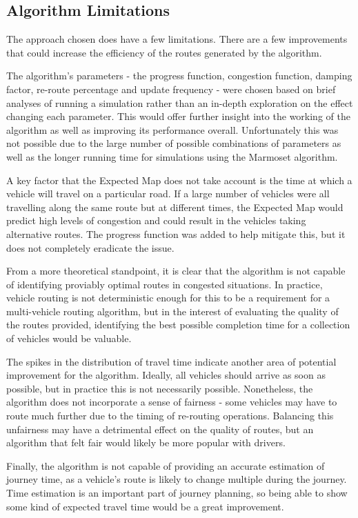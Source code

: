 \documentclass[ %
                    author={Alexander Hill},
                supervisor={Dr. Benjamin Sach},
                    degree={MEng},
                     title={MARMOSET},
                  subtitle={Multi-Agent Route Management using Online Simulation for Efficient Transportation},
                      type={research},
                      year={2016} ]{dissertation}
\begin{document}
\subsection{Algorithm Limitations}\label{sec:algolim}

The approach chosen does have a few limitations. There are a few improvements
that could increase the efficiency of the routes generated by the algorithm.

The algorithm's parameters - the progress function, congestion function, damping
factor, re-route percentage and update frequency - were chosen based on brief
analyses of running a simulation rather than an in-depth exploration on the
effect changing each parameter. This would offer further insight into the
working of the algorithm as well as improving its performance overall.
Unfortunately this was not possible due to the large number of possible
combinations of parameters as well as the longer running time for simulations
using the Marmoset algorithm.

A key factor that the Expected Map does not take account is the time at which a
vehicle will travel on a particular road. If a large number of vehicles were all
travelling along the same route but at different times, the Expected Map would
predict high levels of congestion and could result in the vehicles taking
alternative routes. The progress function was added to help mitigate this, but
it does not completely eradicate the issue.

From a more theoretical standpoint, it is clear that the algorithm is not
capable of identifying proviably optimal routes in congested situations.
In practice, vehicle routing is not deterministic enough for this to be a
requirement for a multi-vehicle routing algorithm, but in the interest of
evaluating the quality of the routes provided, identifying the best possible
completion time for a collection of vehicles would be valuable.

The spikes in the distribution of travel time indicate another area of potential
improvement for the algorithm. Ideally, all vehicles should arrive as soon as
possible, but in practice this is not necessarily possible. Nonetheless, the
algorithm does not incorporate a sense of fairness - some vehicles may have to
route much further due to the timing of re-routing operations. Balancing this
unfairness may have a detrimental effect on the quality of routes, but an
algorithm that felt fair would likely be more popular with drivers.

Finally, the algorithm is not capable of providing an accurate estimation of
journey time, as a vehicle's route is likely to change multiple during the
journey. Time estimation is an important part of journey planning, so being
able to show some kind of expected travel time would be a great improvement.
\end{document}
